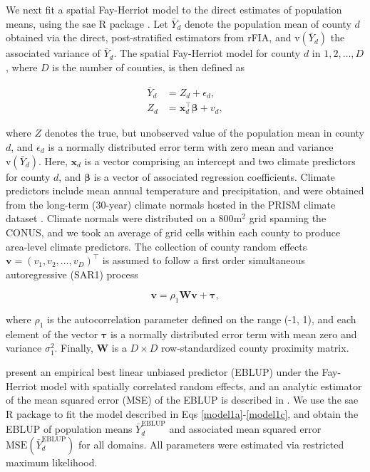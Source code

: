 \documentclass[11pt]{article}
\begin{document}
We next fit a spatial Fay-Herriot model to the direct estimates of population means, using the sae R package \citep{molina2015sae}. Let $\bar{Y}_d$ denote the population mean of county $d$ obtained via the direct, post-stratified estimators from rFIA, and $\mathrm{v}( \bar{Y}_{d} )$ the associated variance of $\bar{Y}_d$. The spatial Fay-Herriot model for county $d$ in $1,2, \ldots, D$, where $D$ is the number of counties, is then defined as
\begin{linenomath*}
\label{model1}
\begin{align}
   \bar{Y}_d &= Z_{d} + \epsilon_{d}, \label{model1a} \\ 
   Z_{d} &= \mathbf{x}_{d}^\top \boldsymbol{\beta} + v_{d}, \label{model1b}
\end{align}
\end{linenomath*}
where $Z$ denotes the true, but unobserved value of the population mean in county $d$, and $\epsilon_{d}$ is a normally distributed error term with zero mean and variance $\mathrm{v}( \bar{Y}_{d} )$. Here, $\mathbf{x}_d$ is a vector comprising an intercept and two climate predictors for county $d$, and $\boldsymbol{\beta}$ is a vector of associated regression coefficients. Climate predictors include mean annual temperature and precipitation, and were obtained from the long-term (30-year) climate normals hosted in the PRISM climate dataset \citep{prism}. Climate normals were distributed on a 800$\mathrm{m}^2$ grid spanning the CONUS, and we took an average of grid cells within each county to produce area-level climate predictors. The collection of county random effects  $\mathbf{v} = (v_1, v_2, \ldots, v_D)^\top$ is assumed to follow a first order simultaneous autoregressive (SAR1) process
\begin{linenomath*}
\begin{equation}
   \mathbf{v} = \rho_{1} \mathbf{W} \mathbf{v} + \boldsymbol{\tau}, \label{model1c}
\end{equation}
\end{linenomath*}
where $\rho_{1}$ is the autocorrelation parameter defined on the range (-1, 1), and each element of the vector $\boldsymbol{\tau}$ is a normally distributed error term with mean zero and variance $\sigma_{1}^2$. Finally, $\mathbf{W}$ is a $D \times D$ row-standardized county proximity matrix.

\citet{petrucci2006small} present an empirical best linear unbiased predictor (EBLUP) under the Fay-Herriot model with spatially correlated random effects, and an analytic estimator of the mean squared error (MSE) of the EBLUP is described in \citet{singh2005spatio}. We use the sae R package \citep{molina2015sae} to fit the model described in Eqs \ref{model1a}-\ref{model1c}, and obtain the EBLUP of population means $\bar{Y}_{d}^{\mathrm{EBLUP}}$ and associated mean squared error $\mathrm{MSE}(\bar{Y}_{d}^{\mathrm{EBLUP}})$ for all domains. All parameters were estimated via restricted maximum likelihood. 
\end{document}
